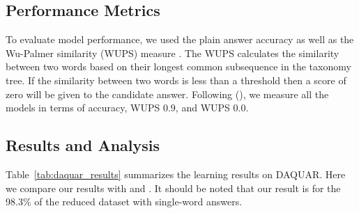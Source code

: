 \documentclass{article}
\renewcommand{\*}[1]{\textbf{#1}}
\newcommand{\shortcite}[1]{\citeauthor{#1} (\citeyear{#1})}
\begin{document}
\subsection{Performance Metrics}
To evaluate model performance, we used the plain answer accuracy as well as 
the Wu-Palmer similarity (WUPS) measure \cite{wu94, mal14b}. The WUPS 
calculates the similarity between two words based on their longest common 
subsequence in the taxonomy tree. If the similarity between two words is less 
than a threshold then a score of zero will be given to the candidate answer. 
Following \shortcite{mal14b}, we measure all the models in terms of accuracy, 
WUPS 0.9, and WUPS 0.0.

\subsection{Results and Analysis}
Table~\ref{tab:daquar_results} summarizes the learning results on DAQUAR. Here
we compare our results with \cite{mal14b} and \cite{mal15}. 
It should be noted that our result is for the 98.3\% of 
the reduced dataset with single-word answers.
\end{document}
